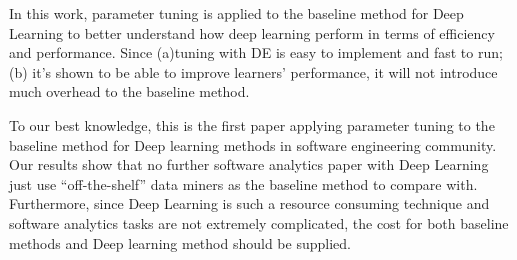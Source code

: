 In this work, parameter tuning is applied to the baseline method for Deep Learning
to better understand how deep learning perform in terms of efficiency and performance.
Since (a)tuning with DE is easy to implement and fast to run; (b) it's shown to be able
to improve learners' performance, it will not introduce much overhead to the baseline method.

To our best knowledge, this is the first paper
applying parameter tuning to the baseline method for Deep learning methods in 
software engineering community. Our results show that no further software analytics
paper with Deep Learning just use ``off-the-shelf'' data miners as the baseline
method to compare with. Furthermore, since Deep Learning is such a resource consuming
technique and software analytics tasks are not extremely complicated, the cost for 
both baseline methods and Deep learning method should be supplied.











